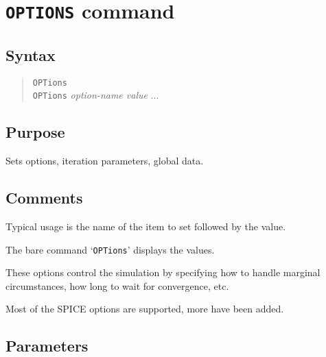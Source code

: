 \section{{\tt OPTIONS} command}
\subsection{Syntax}
\begin{verse}
{\tt OPTions}\\
{\tt OPTions} {\it option-name value} ...
\end{verse}
\subsection{Purpose}

Sets options, iteration parameters, global data.
\subsection{Comments}

Typical usage is the name of the item to set followed by the
value.

The bare command `{\tt OPTions}' displays the values.

These options control the simulation by specifying how to
handle marginal circumstances, how long to wait for
convergence, etc.

Most of the SPICE options are supported, more have been	added.
\subsection{Parameters}

